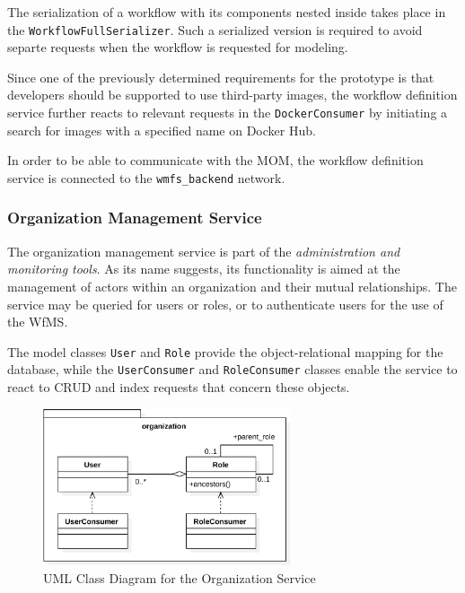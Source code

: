     The serialization of a workflow with its components nested inside takes place in the \texttt{WorkflowFullSerializer}. Such a serialized version is required to avoid separte requests when the workflow is requested for modeling.

    Since one of the previously determined requirements for the prototype is that developers should be supported to use third-party images, the workflow definition service further reacts to relevant requests in the \texttt{DockerConsumer} by initiating a search for images with a specified name on Docker Hub.

    In order to be able to communicate with the \ac{MOM}, the workflow definition service is connected to the \texttt{wmfs\_backend} network.

  \subsubsection{Organization Management Service} %
    \label{subs:organization_management_service}
    The organization management service is part of the \emph{administration and monitoring tools}.
    As its name suggests, its functionality is aimed at the management of actors within an organization and their mutual relationships. The service may be queried for users or roles, or to authenticate users for the use of the \ac{WfMS}.

    The model classes \texttt{User} and \texttt{Role} provide the object-relational mapping for the database, while the \texttt{UserConsumer} and \texttt{RoleConsumer} classes enable the service to react to \ac{CRUD} and index requests that concern these objects.

    \begin{figure}[htbp]
      \centering
      \includegraphics[width=0.65\textwidth]{content/images/class_diagram_organization-crop.pdf}
      \caption{UML Class Diagram for the Organization Service}
      \label{fig:uml_class_diagram_for_the_organization_service}
    \end{figure}

